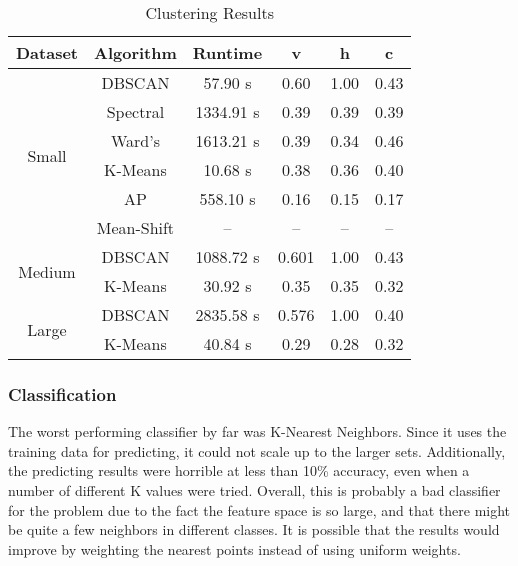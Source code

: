 \documentclass[letterpaper,10pt]{article}
\begin{document}
\begin{table}[ht]
\center
\begin{tabular}{cccccc}
Dataset & Algorithm & Runtime & \textbf{v} & \textbf{h} & \textbf{c} \\
\hline
\multicolumn{1}{c}{\multirow{6}{*}{Small}}
      & DBSCAN & 57.90 s & 0.60 & 1.00 & 0.43 \\
      & Spectral & 1334.91 s & 0.39 & 0.39 & 0.39 \\
      & Ward's & 1613.21 s & 0.39 & 0.34 & 0.46 \\
      & K-Means & 10.68 s & 0.38 & 0.36 & 0.40 \\
      & AP & 558.10 s & 0.16 & 0.15 & 0.17 \\
      & Mean-Shift & -- & -- & -- & -- \\
\hline
\multicolumn{1}{c}{\multirow{2}{*}{Medium}}
      & DBSCAN & 1088.72 s & 0.601 & 1.00 & 0.43 \\
      & K-Means & 30.92 s & 0.35 & 0.35 & 0.32 \\
\hline
\multicolumn{1}{c}{\multirow{2}{*}{Large}}
      & DBSCAN & 2835.58 s & 0.576 & 1.00 & 0.40 \\
      & K-Means & 40.84 s & 0.29 & 0.28 & 0.32 \\
\hline
\end{tabular}
\caption{Clustering Results}
\label{tbl:clustering}
\end{table}


\subsubsection{Classification}

The worst performing classifier by far was K-Nearest Neighbors. Since it
uses the training data for predicting, it could not scale up to the larger
sets.  Additionally, the predicting results were horrible at less than 10\%
accuracy, even when a number of different K values were tried. Overall,
this is probably a bad classifier for the problem due to the fact the
feature space is so large, and that there might be quite a few neighbors in
different classes. It is possible that the results would improve by
weighting the nearest points instead of using uniform weights.
\end{document}
